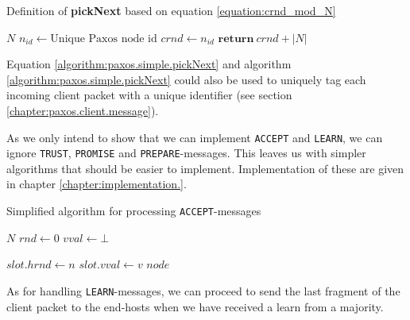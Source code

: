 \begin{algorithm}
  \caption{Definition of \textbf{pickNext} based on equation \ref{equation:crnd_mod_N}}
  \label{algorithm:paxos.simple.pickNext}
  \begin{algorithmic}
    \State $N$ 
    \State $n_{id} \gets \text{Unique Paxos node id}$
    \State $crnd \gets n_{id}$ 
    \State
      \State $\textbf{return}\ crnd + |N|$ 
    \EndFunction
  \end{algorithmic}
\end{algorithm}

Equation \ref{algorithm:paxos.simple.pickNext} and algorithm
\ref{algorithm:paxos.simple.pickNext} could also be used to uniquely tag
each incoming client packet with a unique identifier (see section
\ref{chapter:paxos.client.message}).

As we only intend to show that we can implement \texttt{ACCEPT} and
\texttt{LEARN}, we can ignore \texttt{TRUST}, \texttt{PROMISE} and
\texttt{PREPARE}-messages.
%
This leaves us with simpler algorithms that should be easier to implement.
%
Implementation of these are given in chapter \ref{chapter:implementation.}.

\begin{algorithm}
  \caption{Simplified algorithm for processing \texttt{ACCEPT}-messages}
  \label{algorithm:paxos.simple.acceptor}
  \begin{algorithmic}
    \State $N$
    \State $rnd \gets 0$ 
    \State $vval \gets \bot$ 
    \State

        \State $slot.hrnd\gets n$
        \State $slot.vval\gets v$ 
           \State {}
                         {$node$}
        \EndForIn
      \EndIf
    \EndOn
  \end{algorithmic}
\end{algorithm}

As for handling \texttt{LEARN}-messages, we can proceed to send the last
fragment of the client packet to the end-hosts when we have received a
learn from a majority.

